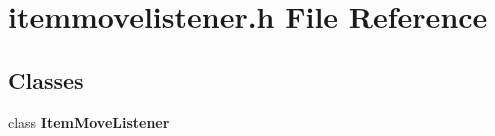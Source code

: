\section{itemmovelistener.\+h File Reference}
\label{bk3_2curve_2itemmovelistener_8h}
\subsection*{Classes}
\begin{DoxyCompactItemize}
\item 
class {\bf Item\+Move\+Listener}
\end{DoxyCompactItemize}
